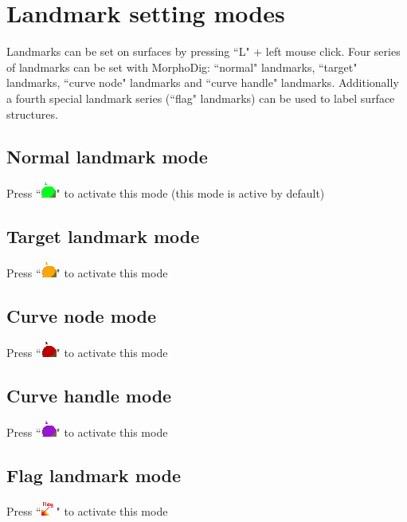 \section{Landmark setting modes}
Landmarks can be set on surfaces by pressing ``L" + left mouse click. 
Four series of landmarks can be set with MorphoDig: ``normal" landmarks, ``target" landmarks, ``curve node" landmarks and ``curve handle" landmarks. Additionally a fourth special landmark series (``flag" landmarks) can be used to label surface structures. 

\subsection{Normal landmark mode}	
Press ``\includegraphics[scale=0.7]{images/04/normal_landmarks.png}" to activate this mode (this mode is active by default)

\subsection{Target landmark mode}	
Press ``\includegraphics[scale=0.7]{images/04/target_landmarks.png}"  to activate this mode

\subsection{Curve node mode}	
Press ``\includegraphics[scale=0.7]{images/04/curve_nodes.png}" to activate this mode 

\subsection{Curve handle mode}	
Press ``\includegraphics[scale=0.7]{images/04/curve_handles.png}"  to activate this mode


\subsection{Flag landmark mode}	
Press ``\includegraphics[scale=0.7]{images/04/flag_landmarks.png}" to activate this mode


